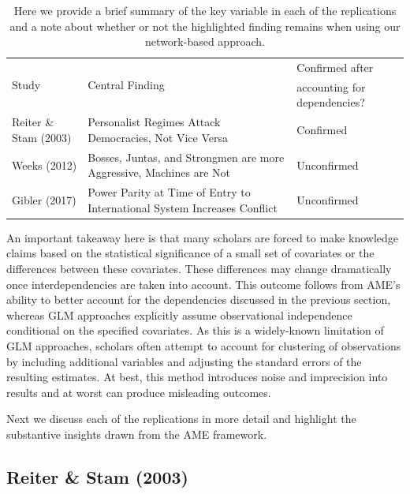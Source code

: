 \begin{table}[ht]
\centering
\caption{Here we provide a brief summary of the key variable in each of the replications and a note about whether or not the highlighted finding remains when using our network-based approach.}
	\begin{tabular}{l p{6cm} l} \toprule
		\multirow{2}{*}{Study} & \multirow{2}{*}{Central Finding} &  Confirmed after \\
		& &  accounting for dependencies? \\ \toprule
		Reiter \& Stam (2003) & Personalist Regimes Attack Democracies, Not Vice Versa & {Confirmed} \\ \midrule
		Weeks (2012) & Bosses, Juntas, and Strongmen are more Aggressive, Machines are Not & {Unconfirmed} \\\midrule
		Gibler (2017) & Power Parity at Time of Entry to International System Increases Conflict & {Unconfirmed}\\ \bottomrule
	\end{tabular}
	\label{tab:modelFindingSumm}
\end{table}

An important takeaway here is that many scholars are forced to make knowledge claims based on the statistical significance of a small set of covariates or the differences between these covariates. These differences may change dramatically once interdependencies are taken into account. This outcome follows from AME's ability to better account for the dependencies discussed in the previous section, whereas GLM approaches explicitly assume observational independence conditional on the specified covariates. As this is a widely-known limitation of GLM approaches, scholars often attempt to account for clustering of observations by including additional variables and adjusting the standard errors of the resulting estimates. At best, this method introduces noise and imprecision into results and at worst can produce misleading outcomes. 

Next we discuss each of the replications in more detail and highlight the substantive insights drawn from the AME framework.

\subsection{Reiter \& Stam (2003)}


